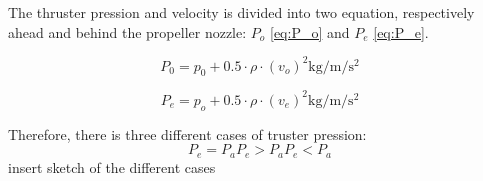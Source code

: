 The thruster pression and velocity is divided into two equation, respectively ahead and behind the propeller nozzle: $P_o$ \eqref{eq:P_o} and $P_e$ \eqref{eq:P_e}.

\begin{equation}
P_0 = p_0 + 0.5 \cdot \rho \cdot(v_o)^2 \si{\kilo\gram\per\meter\per\second\squared} \label{eq:P_o}
\end{equation}
\startexplain
{}
\stopexplain

\begin{equation}
P_e = p_o + 0.5 \cdot \rho \cdot(v_e)^2 \si{\kilo\gram\per\meter\per\second\squared} \label{eq:P_e}
\end{equation}
\startexplain
{}
\stopexplain

Therefore, there is three different cases of truster pression:
\begin{equation}
P_e = P_a
P_e > P_a
P_e < P_a
\end{equation}
 insert sketch of the different cases





